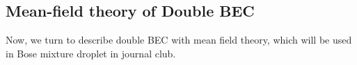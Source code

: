 







% 
\subsection{Mean-field theory of Double BEC}
Now, we turn to describe double BEC with mean field theory, which will be used in Bose mixture droplet in journal club.

